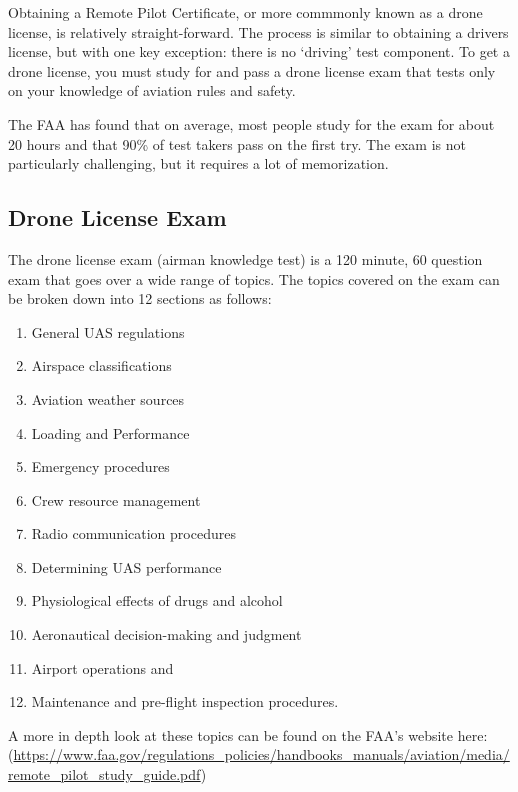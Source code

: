 \documentclass[
  12pt,
]{book}
\providecommand{\tightlist}{%
  \setlength{\itemsep}{0pt}\setlength{\parskip}{0pt}}
\newenvironment{notebox}{
  \definecolor{shadecolor}{gray}{.8}  %
  \color{black}
  \begin{shaded}}
 {\end{shaded}}
\begin{document}
Obtaining a Remote Pilot Certificate, or more commmonly known as a drone license, is relatively straight-forward. The process is similar to obtaining a drivers license, but with one key exception: there is no `driving' test component. To get a drone license, you must study for and pass a drone license exam that tests only on your knowledge of aviation rules and safety.

\begin{notebox}
The FAA has found that on average, most people study for the exam for about 20 hours and that 90\% of test takers pass on the first try. The exam is not particularly challenging, but it requires a lot of memorization.

\end{notebox}

\hypertarget{drone-license-exam}{%
\subsection{Drone License Exam}\label{drone-license-exam}}

The drone license exam (airman knowledge test) is a 120 minute, 60 question exam that goes over a wide range of topics. The topics covered on the exam can be broken down into 12 sections as follows:

\begin{enumerate}
\def\labelenumi{\arabic{enumi}.}
\tightlist
\item
  General UAS regulations
\item
  Airspace classifications
\item
  Aviation weather sources
\item
  Loading and Performance
\item
  Emergency procedures
\item
  Crew resource management
\item
  Radio communication procedures
\item
  Determining UAS performance
\item
  Physiological effects of drugs and alcohol
\item
  Aeronautical decision-making and judgment
\item
  Airport operations
  and
\item
  Maintenance and pre-flight inspection procedures.
\end{enumerate}

A more in depth look at these topics can be found on the FAA's website here: (\url{https://www.faa.gov/regulations_policies/handbooks_manuals/aviation/media/remote_pilot_study_guide.pdf})
\end{document}
